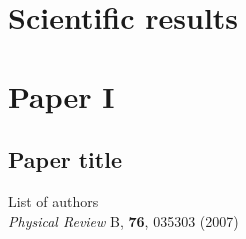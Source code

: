 \chapter{Scientific results}


\chapter*{Paper I}
\section{Paper title}

\noindent List of authors\\

\noindent \textit{Physical Review} B, \textbf{76}, 035303 (2007)
\cleardoublepage


